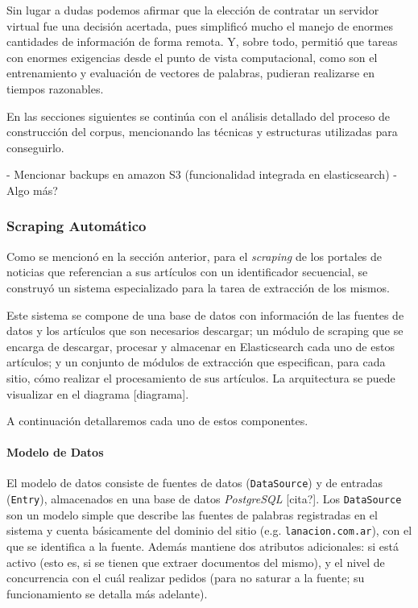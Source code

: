 Sin lugar a dudas podemos afirmar que la elección de contratar un servidor virtual fue una decisión acertada,
pues simplificó mucho el manejo de enormes cantidades de información de forma remota. Y, sobre todo,
permitió que tareas con enormes exigencias desde el punto de vista computacional, como son el entrenamiento
y evaluación de vectores de palabras, pudieran realizarse en tiempos razonables.

En las secciones siguientes se continúa con el análisis detallado del proceso de construcción del corpus,
mencionando las técnicas y estructuras utilizadas para conseguirlo.

- Mencionar backups en amazon S3 (funcionalidad integrada en elasticsearch)
- Algo más?


\subsubsection{Scraping Automático}

Como se mencionó en la sección anterior, para el \textit{scraping} de los portales de noticias que
referencian a sus artículos con un identificador secuencial, se construyó un sistema especializado
para la tarea de extracción de los mismos.

Este sistema se compone de una base de datos con información de las fuentes de datos y los
artículos que son necesarios descargar; un módulo de scraping que se encarga de descargar, procesar
y almacenar en Elasticsearch cada uno de estos artículos; y un conjunto de módulos de extracción que
especifican, para cada sitio, cómo realizar el procesamiento de sus artículos. La arquitectura se
puede visualizar en el diagrama [diagrama].

A continuación detallaremos cada uno de estos componentes.


\paragraph{Modelo de Datos}

El modelo de datos consiste de fuentes de datos (\texttt{DataSource}) y de entradas
(\texttt{Entry}), almacenados en una base de datos \textit{PostgreSQL} [cita?]. Los
\texttt{DataSource} son un modelo simple que describe las fuentes de palabras registradas en el
sistema y cuenta básicamente del dominio del sitio (e.g. \texttt{lanacion.com.ar}), con el que se
identifica a la fuente. Además mantiene dos atributos adicionales: si está activo (esto es, si se
tienen que extraer documentos del mismo), y el nivel de concurrencia con el cuál realizar pedidos
(para no saturar a la fuente; su funcionamiento se detalla más adelante).

